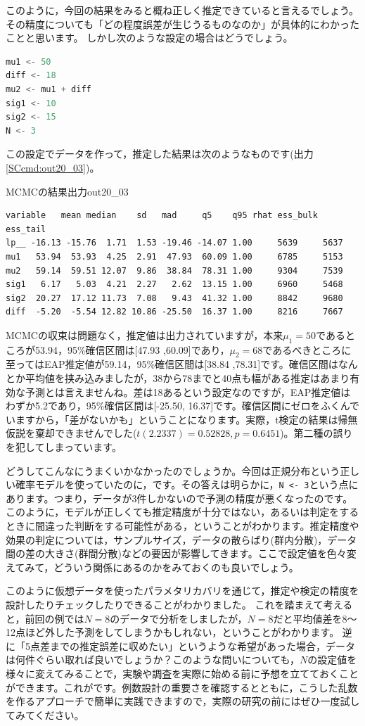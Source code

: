 \documentclass{ltjsbook}
\begin{document}
このように，今回の結果をみると概ね正しく推定できていると言えるでしょう。その精度についても「どの程度誤差が生じうるものなのか」が具体的にわかったことと思います。
しかし次のような設定の場合はどうでしょう。
\begin{lstlisting}[language=c++,label={code::20_05},caption={仮想データの生成その2}]
mu1 <- 50
diff <- 18
mu2 <- mu1 + diff
sig1 <- 10
sig2 <- 15
N <- 3
\end{lstlisting}
この設定でデータを作って，推定した結果は次のようなものです(出力\ref{SCcmd:out20_03})。
\begin{SCcmd}{MCMCの結果出力}{out20_03}
\begin{verbatim}
variable   mean median    sd   mad     q5    q95 rhat ess_bulk ess_tail
lp__ -16.13 -15.76  1.71  1.53 -19.46 -14.07 1.00     5639     5637
mu1   53.94  53.93  4.25  2.91  47.93  60.09 1.00     6785     5153
mu2   59.14  59.51 12.07  9.86  38.84  78.31 1.00     9304     7539
sig1   6.17   5.03  4.21  2.27   2.62  13.15 1.00     6960     5468
sig2  20.27  17.12 11.73  7.08   9.43  41.32 1.00     8842     9680
diff  -5.20  -5.54 12.82 10.86 -25.50  16.37 1.00     8216     7667
\end{verbatim}
\end{SCcmd}
MCMCの収束は問題なく，推定値は出力されていますが，本来$\mu_1=50$であるところが53.94，95\%確信区間は[47.93 ,60.09]であり，$\mu_2=68$であるべきところに至ってはEAP推定値が59.14，95\%確信区間は[38.84 ,78.31]です。確信区間はなんとか平均値を挟み込みましたが，38から78までと40点も幅がある推定はあまり有効な予測とは言えませんね。差は18あるという設定なのですが，EAP推定値はわずか5.2であり，95\%確信区間は[-25.50, 16.37]です。確信区間にゼロをふくんでいますから，「差がないかも」ということになります。実際，t検定の結果は帰無仮説を棄却できませんでした($t(2.2337)=0.52828,p=0.6451$)。第二種の誤りを犯してしまっています。

どうしてこんなにうまくいかなかったのでしょうか。今回は正規分布という正しい確率モデルを使っていたのに，です。その答えは明らかに，\verb|N <- 3|という点にあります。つまり，データが3件しかないので予測の精度が悪くなったのです。
このように，モデルが正しくても推定精度が十分ではない，あるいは判定をするときに間違った判断をする可能性がある，ということがわかります。推定精度や効果の判定については，サンプルサイズ，データの散らばり(群内分散)，データ間の差の大きさ(群間分散)などの要因が影響してきます。ここで設定値を色々変えてみて，どういう関係にあるのかをみておくのも良いでしょう。

このように仮想データを使ったパラメタリカバリを通じて，推定や検定の精度を設計したりチェックしたりできることがわかりました。
これを踏まえて考えると，前回の例では$N=8$のデータで分析をしましたが，$N=8$だと平均値差を8〜12点ほど外した予測をしてしまうかもしれない，ということがわかります。
逆に「5点差までの推定誤差に収めたい」というような希望があった場合，データは何件ぐらい取れば良いでしょうか？このような問いについても，$N$の設定値を様々に変えてみることで，実験や調査を実際に始める前に予想を立てておくことができます。これがです。例数設計の重要さを確認するとともに，こうした乱数を作るアプローチで簡単に実践できますので，実際の研究の前にはぜひ一度試してみてください。
\end{document}
